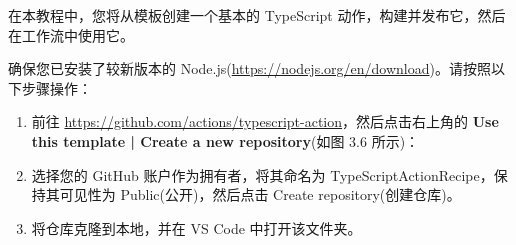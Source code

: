 
在本教程中，您将从模板创建一个基本的 TypeScript 动作，构建并发布它，然后在工作流中使用它。


确保您已安装了较新版本的 Node.js(\url{https://nodejs.org/en/download})。请按照以下步骤操作：

\begin{enumerate}
\item 
前往 \url{https://github.com/actions/typescript-action}，然后点击右上角的 \textbf{Use this template | Create a new repository}(如图 3.6 所示)：


\item 
选择您的 GitHub 账户作为拥有者，将其命名为 TypeScriptActionRecipe，保持其可见性为 Public(公开)，然后点击 Create repository(创建仓库)。

\item 
将仓库克隆到本地，并在 VS Code 中打开该文件夹。
\end{enumerate}



